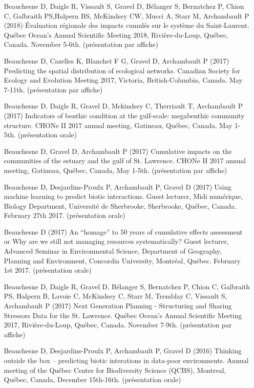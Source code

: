 \begin{singlespace}
Beauchesne D, Daigle R, Vissault S, Gravel D, Bélanger S, Bernatchez P, Chion C, Galbraith PS,Halpern BS, McKindsey CW, Mucci A, Starr M, Archambault P (2018) Évaluation régionale des impacts cumulés sur le système du Saint-Laurent. Québec Ocean's Annual Scientific Meeting 2018, Rivière-du-Loup, Québec, Canada. November 5-6th. (présentation par affiche)

Beauchesne D, Cazelles K, Blanchet F G, Gravel D, Archambault P (2017) Predicting the spatial distribution of ecological networks. Canadian Society for Ecology and Evolution Meeting 2017, Victoria, British-Columbia, Canada. May 7-11th. (présentation par affiche)

Beauchesne D, Daigle R, Gravel D, Mckindsey C, Therriault T, Archambault P (2017) Indicators of benthic condition at the gulf-scale: megabenthic community structure. CHONe II 2017 annual meeting, Gatineau, Québec, Canada, May 1-5th. (présentation orale)

Beauchesne D, Gravel D, Archambault P (2017) Cumulative impacts on the communities of the estuary and the gulf of St. Lawrence. CHONe II 2017 annual meeting, Gatineau, Québec, Canada, May 1-5th. (présentation par affiche)

Beauchesne D, Desjardins-Proulx P, Archambault P, Gravel D (2017) Using machine learning to predict biotic interactions. Guest lecturer, Midi numérique, Biology Department, Université de Sherbrooke, Sherbrooke, Québec, Canada. February 27th 2017. (présentation orale)

Beauchesne D (2017) An “homage” to 50 years of cumulative effects assessment or Why are we still not managing resources systematically? Guest lecturer, Advanced Seminar in Environmental Science, Department of Geography, Planning and Environment, Concordia University, Montréal, Québec. February 1st 2017. (présentation orale)

Beauchesne D, Daigle R, Gravel D, Bélanger S, Bernatchez P, Chion C, Galbraith PS, Halpern B, Lavoie C, McKindsey C, Starr M, Tremblay C, Vissault S, Archambault P (2017) Next Generation Planning - Structuring and Sharing Stressors Data for the St. Lawrence. Québec Ocean's Annual Scientific Meeting 2017, Rivière-du-Loup, Québec, Canada. November 7-9th. (présentation par affiche)

Beauchesne D, Desjardins-Proulx P, Archambault P, Gravel D (2016) Thinking outside the box – predicting biotic interations in data-poor environments. Annual meeting of the Québec Center for Biodiversity Science (QCBS), Montreal, Québec, Canada, December 15th-16th. (présentation orale)


\end{singlespace}
